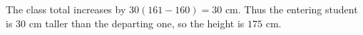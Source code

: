 The class total increases by $30(161-160)=30$ cm. Thus the entering student is $30$ cm taller than the departing one, so the height is $\boxed{175\text{ cm}}$.
